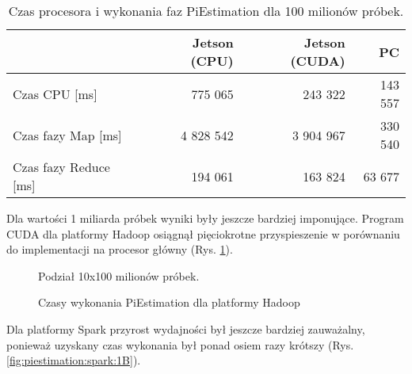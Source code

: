 \begin{table}[h]
    \centering
    \caption{Czas procesora i wykonania faz PiEstimation dla 100 milionów próbek.}
    \begin{tabular}{ | l | r | r | r | }
        \hline
                              & Jetson (CPU) & Jetson (CUDA) & PC     \\
        \hline
        Czas CPU [ms]         & 775 065       & 243 322        & 143 557 \\
        Czas fazy Map [ms]    & 4 828 542      & 3 904 967       & 330 540 \\
        Czas fazy Reduce [ms] & 194 061       & 163 824        & 63 677  \\
        \hline
    \end{tabular}
    \label{tab:piestimation:mapreduce:100M}
\end{table}

Dla wartości 1 miliarda próbek wyniki były jeszcze bardziej imponujące. Program CUDA dla platformy Hadoop
osiągnął pięciokrotne przyspieszenie w porównaniu do implementacji na procesor główny (Rys. \ref{fig:piestimation:hadoop:1B}).

\begin{figure}[h]
    \centering
    \caption{Czasy wykonania PiEstimation dla platformy Hadoop}
    \medskip \small
    Podział 10x100 milionów próbek.
    \label{fig:piestimation:hadoop:1B}
\end{figure}

Dla platformy Spark przyrost wydajności był jeszcze bardziej zauważalny, ponieważ uzyskany czas wykonania
był ponad osiem razy krótszy (Rys. \ref{fig:piestimation:spark:1B}).

